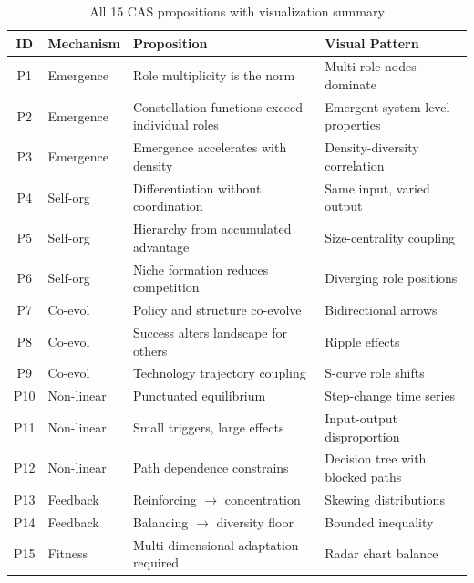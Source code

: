 \documentclass[../main.tex]{subfiles}
\begin{document}
\begin{table}[h]
\centering
\caption{All 15 CAS propositions with visualization summary}
\tableminimal
\scriptsize
\begin{tabular}{@{}clp{6cm}p{3.5cm}@{}}
\toprule
\textbf{ID} & \textbf{Mechanism} & \textbf{Proposition} & \textbf{Visual Pattern} \\
\midrule
P1 & Emergence & Role multiplicity is the norm & Multi-role nodes dominate \\
P2 & Emergence & Constellation functions exceed individual roles & Emergent system-level properties \\
P3 & Emergence & Emergence accelerates with density & Density-diversity correlation \\
\addlinespace
P4 & Self-org & Differentiation without coordination & Same input, varied output \\
P5 & Self-org & Hierarchy from accumulated advantage & Size-centrality coupling \\
P6 & Self-org & Niche formation reduces competition & Diverging role positions \\
\addlinespace
P7 & Co-evol & Policy and structure co-evolve & Bidirectional arrows \\
P8 & Co-evol & Success alters landscape for others & Ripple effects \\
P9 & Co-evol & Technology trajectory coupling & S-curve role shifts \\
\addlinespace
P10 & Non-linear & Punctuated equilibrium & Step-change time series \\
P11 & Non-linear & Small triggers, large effects & Input-output disproportion \\
P12 & Non-linear & Path dependence constrains & Decision tree with blocked paths \\
\addlinespace
P13 & Feedback & Reinforcing $\rightarrow$ concentration & Skewing distributions \\
P14 & Feedback & Balancing $\rightarrow$ diversity floor & Bounded inequality \\
P15 & Fitness & Multi-dimensional adaptation required & Radar chart balance \\
\bottomrule
\end{tabular}
\end{table}
\end{document}
